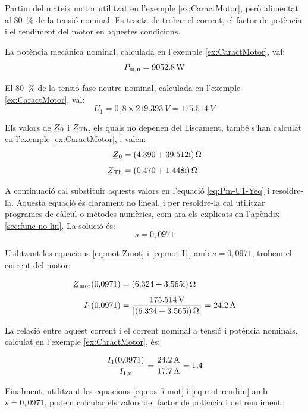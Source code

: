 	
\begin{exemple}\label{ex:MotTensRedSolAp}
	\addcontentsxms{\MotTensRedSolAp}	
	Partim del mateix motor utilitzat en l'exemple \vref{ex:CaractMotor}, però alimentat al \qty{80}{\%} de la tensió nominal. Es tracta de trobar el corrent, el factor de potència i el rendiment del motor en aquestes condicions.
	
	La potència mecànica nominal, calculada  en l'exemple \ref{ex:CaractMotor}, val: \[
	P_\mathrm{m,n} = \qty{9052,8}{W}
	\]
	
	El \qty{80}{\%} de la tensió fase-neutre nominal, calculada  en l'exemple \ref{ex:CaractMotor}, val:
	\[
	U_1 = 0{,}8\times\qty{219,393}{V} = \qty{175,514}{V}
	\]
	
	Els valors de $\cmplx{Z}_0$ i  $\cmplx{Z}\ped{Th}$, els quals no depenen del lliscament, també s'han calculat en  l'exemple \ref{ex:CaractMotor}, i valen:
	\begin{align*}
	\cmplx{Z}_0 &=  \complexqty{4,390+j39,512}{\ohm} \\[1ex]
	\cmplx{Z}\ped{Th} &= \complexqty{0,470+j1,448}{\ohm} 
	\end{align*}
	
	A continuació cal substituir aquests valors en l'equació \eqref{eq:Pm-U1-Yeq} i resoldre-la. Aquesta equació és clarament no lineal, i per  resoldre-la cal utilitzar programes de càlcul o mètodes numèrics, com ara els explicats en l'apèndix \ref{sec:func-no-lin}. La solució és:
	\[
	s = 0{,}0971
	\]
	
	Utilitzant les equacions \eqref{eq:mot-Zmot} i \eqref{eq:mot-I1} amb $s  = 0{,}0971$, trobem el corrent del motor:
	
	\begin{align*}
	\cmplx{Z}\ped{mot}(0{,}0971) &=  \complexqty{6,324+j3,565}{\ohm} \\[1ex]
	I_1(0{,}0971) &= \frac{\qty{175,514}{V}}{|\complexqty{6,324+j3,565}{\ohm}|} = \qty{24,2}{A}
	\end{align*}
	
	La relació entre aquest  corrent i el corrent nominal a tensió i potència nominals, calculat en l'exemple \ref{ex:CaractMotor}, és:
	
	\[
	\frac{I_1(0{,}0971)}{I_\mathrm{1,n}} = \frac{\qty{24,2}{A}}{\qty{17,7}{A}} = 1{,}4
	\]
	
	Finalment, utilitzant les equacions  \eqref{eq:cos-fi-mot} i \eqref{eq:mot-rendim} amb $s  = 0{,}0971$, podem calcular els valors del factor de potència i del rendiment:
	

\end{exemple}
